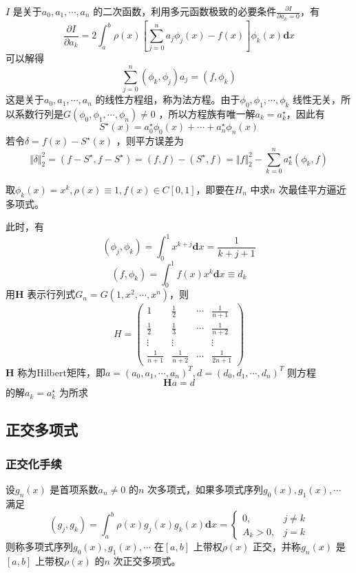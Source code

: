 \documentclass[a4paper]{article}
\begin{document}
$I$ 是关于$a_0, a_1, \cdots, a_{n}$ 的二次函数，利用多元函数极致的必要条件$\frac{\partial I}{\partial a_k = 0}$，有
\[
	\frac{\partial I}{\partial a_k} = 2 \int_{a}^{b} \rho(x) [\sum_{j=0}^{n} a_j \phi_j(x) - f(x)] \phi_k (x) \mathbf{d} x 
\] 
可以解得
\[
\sum_{j=0}^{n} (\phi_k, \phi_j) a_j = (f, \phi_k)
\] 
这是关于$a_0, a_1, \cdots, a_n$ 的线性方程组，称为法方程。由于$\phi_0, \phi_1, \cdots, \phi_k$ 线性无关，所以系数行列是$G(\phi_0, \phi_1, \cdots, \phi_n) \neq 0$ ，所以方程族有唯一解$a_k = a_k^{\star}$，因此有
\[
S^{\star}(x) = a_0^{\star} \phi_0(x) + \cdots + a_n^{\star} \phi_n(x)
\] 
若令$\delta = f(x) - S^{\star}(x)$ ，则平方误差为
\[
\Vert \delta \Vert_2^2 = (f - S^{\star}, f - S^{\star}) = (f,f) - (S^{\star}, f) = \Vert f \Vert_2^2 - \sum_{k=0}^{n} a_k^{\star} (\phi_k, f)
\] 

取$\phi_k(x) = x^{k}, \rho(x) \equiv 1, f(x) \in C[0,1]$，即要在$H_n$ 中求$n$ 次最佳平方逼近多项式。

此时，有
\[
	(\phi_j, \phi_k) = \int_{0}^{1} x^{k+j} \mathbf{d} x = \frac{1}{k+j+1}
\] 
\[
	(f, \phi_k) = \int_{0}^{1} f(x) x^{k} \mathbf{d} x \equiv d_k
\] 
用$\textbf{H}$ 表示行列式$G_n = G(1, x^2, \cdots, x^{n})$，则
\[
	H = \begin{pmatrix} 
		1 & \frac{1}{2} & \cdots & \frac{1}{n+1} \\
		\frac{1}{2} & \frac{1}{3} & \cdots & \frac{1}{n+2} \\
		\vdots & \vdots & & \vdots \\
		\frac{1}{n+1} & \frac{1}{n+2} & \cdots & \frac{1}{2n+1}
	\end{pmatrix} 
\] 
$\textbf{H}$ 称为Hilbert矩阵，即$a = (a_0, a_1, \cdots, a_n)^T, d = (d_0, d_1, \cdots, d_n)^T$
则方程
\[
	\textbf{H} a = d
\] 
的解$a_k = a_k^{\star}$ 为所求

\subsection{正交多项式}
\subsubsection{正交化手续}
\begin{definition}
设$g_n(x)$ 是首项系数$a_n \neq 0$ 的$n$ 次多项式，如果多项式序列$g_0(x), g_1(x), \cdots$ 满足
\[
	(g_j, g_k) = \int_{a}^{b} \rho(x) g_j(x) g_k(x) \mathbf{d} x = 
	\begin{cases}
		0, & j \neq k \\
		A_k > 0, & j = k
	\end{cases}
\] 
则称多项式序列$g_0(x), g_1(x), \cdots$ 在$[a,b]$ 上带权$\rho(x)$ 正交，并称$g_n(x)$ 是$[a,b]$ 上带权$\rho(x)$ 的$n$ 次正交多项式。
\end{definition}
\end{document}
